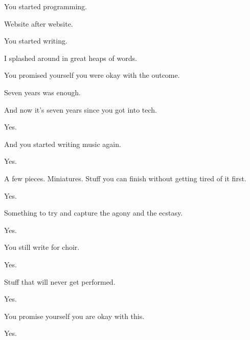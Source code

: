 \begin{paracol}{2}
\begin{leftcolumn}
\begin{ally}
You started programming.
\end{ally}
Website after website.

\begin{ally}
You started writing.
\end{ally}
I splashed around in great heaps of words.

\begin{ally}
You promised yourself you were okay with the outcome.
\end{ally}
Seven years was enough.

\begin{ally}
And now it's seven years since you got into tech.
\end{ally}
Yes.

\begin{ally}
And you started writing music again.
\end{ally}
Yes.

\begin{ally}
A few pieces. Miniatures. Stuff you can finish without getting tired of it first.
\end{ally}
Yes.

\begin{ally}
Something to try and capture the agony and the ecstasy.
\end{ally}
Yes.

\begin{ally}
You still write for choir.
\end{ally}
Yes.

\begin{ally}
Stuff that will never get performed.
\end{ally}
Yes.

\begin{ally}
You promise yourself you are okay with this.
\end{ally}
Yes.
\newpage
\end{leftcolumn}
\end{paracol}
